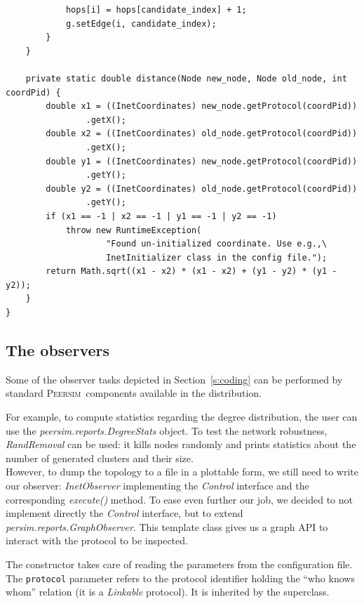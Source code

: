 \documentclass[a4paper,12pt]{article}
\newcommand{\id}[1]{{\scshape\small #1}}
\newcommand{\psim}{\id{Peersim}}
\begin{document}
\begin{verbatim}
            hops[i] = hops[candidate_index] + 1;
            g.setEdge(i, candidate_index);
        }
    }

    private static double distance(Node new_node, Node old_node, int coordPid) {
        double x1 = ((InetCoordinates) new_node.getProtocol(coordPid))
                .getX();
        double x2 = ((InetCoordinates) old_node.getProtocol(coordPid))
                .getX();
        double y1 = ((InetCoordinates) new_node.getProtocol(coordPid))
                .getY();
        double y2 = ((InetCoordinates) old_node.getProtocol(coordPid))
                .getY();
        if (x1 == -1 | x2 == -1 | y1 == -1 | y2 == -1)
            throw new RuntimeException(
                    "Found un-initialized coordinate. Use e.g.,\
                    InetInitializer class in the config file.");
        return Math.sqrt((x1 - x2) * (x1 - x2) + (y1 - y2) * (y1 - y2));
    }
}
\end{verbatim}
\normalsize
     
\subsection{The observers}
\label{s:observers}

Some of the observer tasks depicted in Section~\ref{s:coding} can be performed
by standard \psim~components available in the distribution. 

For example, to compute statistics regarding the degree distribution, the user can
use the \emph{peersim.reports.DegreeStats} object. To test the network
robustness, \emph{RandRemoval} can be used: it kills nodes randomly
and prints statistics about the number of generated clusters and their
size.\\

However, to dump the topology to a file in a plottable form, we still
need to write our observer: \emph{InetObserver} implementing the \emph{Control}
interface and the corresponding 
\emph{execute()} method. To ease even further our job, we decided to
not implement directly the \emph{Control} interface, but to extend
\emph{persim.reports.GraphObserver}. This template class gives us a
graph API to interact with the protocol to be inspected.

The constructor takes care of reading the parameters from the
configuration file. The \texttt{protocol} parameter refers to the
protocol identifier holding the ``who knows whom'' relation (it is a
\emph{Linkable} protocol). It is inherited by the superclass.
\end{document}
